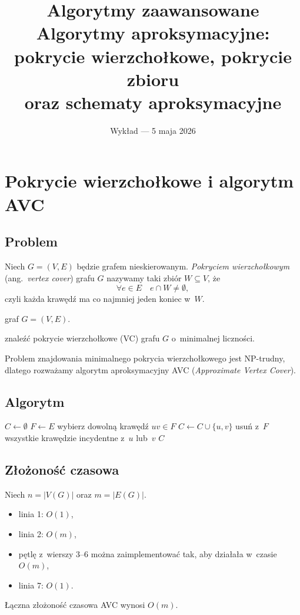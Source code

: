 \documentclass[11pt,a4paper]{article}
\title{\textbf{Algorytmy zaawansowane}\\[2mm]
\large Algorytmy aproksymacyjne: pokrycie wierzchołkowe, pokrycie zbioru\\
oraz schematy aproksymacyjne}
\author{Wykład --- 5 maja 2026}
\date{}
\theoremstyle{plain}
\theoremstyle{definition}
\begin{document}
\maketitle

\section{Pokrycie wierzchołkowe i algorytm AVC}\label{sec:vc}

\subsection*{Problem}
Niech $G=(V,E)$ będzie grafem nieskierowanym. \emph{Pokryciem wierzchołkowym}
(ang.\ \emph{vertex cover}) grafu $G$ nazywamy taki zbiór $W\subseteq V$, że
\[
\forall e\in E\quad e\cap W\neq\emptyset,
\]
czyli każda krawędź ma co najmniej jeden koniec w~$W$.

\begin{description}[leftmargin=2em]
\item[Instancja:] graf $G=(V,E)$.
\item[Problem:] znaleźć pokrycie wierzchołkowe (VC) grafu $G$ o~minimalnej liczności.
\end{description}

Problem znajdowania minimalnego pokrycia wierzchołkowego jest NP-trudny, dlatego
rozważamy algorytm aproksymacyjny \textsc{AVC} (\emph{Approximate Vertex Cover}).

\subsection*{Algorytm}
\begin{algorithm}[H]
\caption{AVC($G$)}
\begin{algorithmic}[1]
\State $C\gets\emptyset$ 
\State $F\gets E$ 
  \State wybierz dowolną krawędź $uv\in F$
  \State $C\gets C\cup\{u,v\}$
  \State usuń z~$F$ wszystkie krawędzie incydentne z~$u$ lub~$v$
\EndWhile
\State \Return $C$
\end{algorithmic}
\end{algorithm}

\subsection*{Złożoność czasowa}
Niech $n=|V(G)|$ oraz $m=|E(G)|$.
\begin{itemize}[leftmargin=1.6em,itemsep=1pt]
\item linia 1: $O(1)$,
\item linia 2: $O(m)$,
\item pętlę z~wierszy 3--6 można zaimplementować tak, aby działała w~czasie $O(m)$,
\item linia 7: $O(1)$.
\end{itemize}
Łączna złożoność czasowa \textsc{AVC} wynosi $O(m)$.
\end{document}
